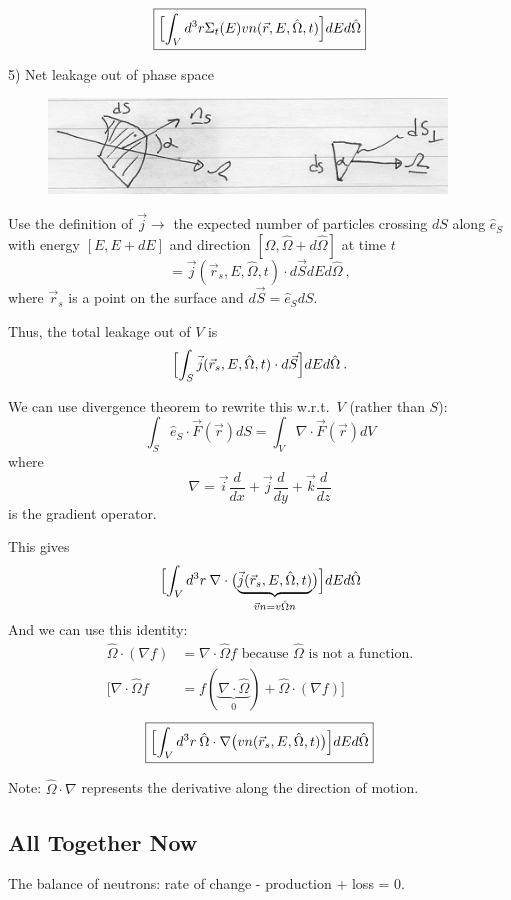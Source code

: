 \documentclass[12pt]{article}
\newcommand{\vOmega}{\ensuremath{\hat{\Omega}}}
\begin{document}
\[\boxed{\Bigl[\int_V d^3r \Sigma_t(E) v n(\vec{r}, E, \vOmega, t) \Bigr] dE d\vOmega }\]

5) Net leakage out of phase space

\begin{figure}[h!]
\begin{center}
\includegraphics[height=1in]{DifferentialArea}
\end{center}
\end{figure}

Use the definition of $\vec{j} \rightarrow$ the expected number of particles crossing $dS$ along $\hat{e}_S$ with energy $[E, E + dE]$ and direction $[\vOmega, \vOmega + d\vOmega]$ at time $t$  
%
\[= \vec{j}(\vec{r}_s, E, \vOmega, t) \cdot d\vec{S} dE d\vOmega\:,\]
%
where $\vec{r}_s$ is a point on the surface and $d\vec{S} = \hat{e}_S dS$.

Thus, the total leakage out of $V$ is
\[\Bigl[\int_S \vec{j}(\vec{r}_s, E, \vOmega, t) \cdot d\vec{S} \Bigr] dE d\vOmega\:. \]

We can use divergence theorem to rewrite this w.r.t.\ $V$ (rather than $S$):
\[\int_S \hat{e}_S \cdot \vec{F} (\vec{r}) dS = \int_V \nabla \cdot \vec{F} (\vec{r}) dV\]
where
\[\nabla = \vec{i}\frac{d}{dx} + \vec{j}\frac{d}{dy} + \vec{k}\frac{d}{dz}\]
is the gradient operator.

This gives
\[\Bigl[\int_V d^3r \: \nabla \cdot \bigl( \underbrace{\vec{j}(\vec{r}_s, E, \vOmega, t)}_{\vec{v}n = v \vOmega n} \bigr) \Bigr] dE d\vOmega \]
%
And we can use this identity:
\begin{align}
%
\vOmega \cdot (\nabla f) &= \nabla \cdot \vOmega f \text{ because }\vOmega\text{ is not a function.} \nonumber\\
\bigl[\nabla \cdot \vOmega f &= f(\underbrace{\nabla \cdot \vOmega}_{0}) + \vOmega \cdot (\nabla f)\bigr] \nonumber
\end{align}
%
\[ \boxed{\Bigl[\int_V d^3r \: \vOmega \cdot \nabla \bigl(v n(\vec{r}_s, E, \vOmega, t) \bigr) \Bigr] dE d\vOmega }\]

Note: $\vOmega \cdot \nabla$ represents the derivative along the direction of motion.

\subsection*{All Together Now}
The balance of neutrons: rate of change - production + loss = 0.
\end{document}

